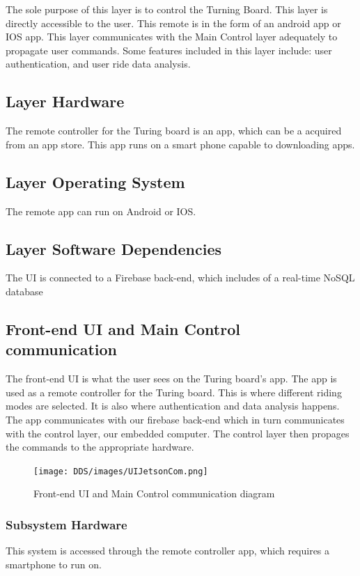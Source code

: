 The sole purpose of this layer is to control the Turning Board. This layer is directly accessible to the user. This remote is in the form of an android app or IOS app. This layer communicates with the Main Control layer adequately to propagate user commands. Some features included in this layer include: user authentication, and user ride data analysis.

\subsection{Layer Hardware}
The remote controller for the Turing board is an app, which can be a acquired from an app store. This app runs on a smart phone capable to downloading apps.


\subsection{Layer Operating System}
The remote app can run on Android or IOS.

\subsection{Layer Software Dependencies}
The UI is connected to a Firebase back-end, which includes of a real-time NoSQL database

\subsection{Front-end UI and Main Control communication}
The front-end UI is what the user sees on the Turing board's app. The app is used as a remote controller for the Turing board. This is where different riding modes are selected. It is also where authentication and data analysis happens. The app communicates with our firebase back-end which in turn communicates with the control layer, our embedded computer. The control layer then propages the commands to the appropriate hardware.

\begin{figure}[h!]
	\centering
 	\texttt{[image: DDS/images/UIJetsonCom.png]} %
 \caption{Front-end UI and Main Control communication diagram} %
\end{figure}

\subsubsection{Subsystem Hardware}
This system is accessed through the remote controller app, which requires a smartphone to run on.

